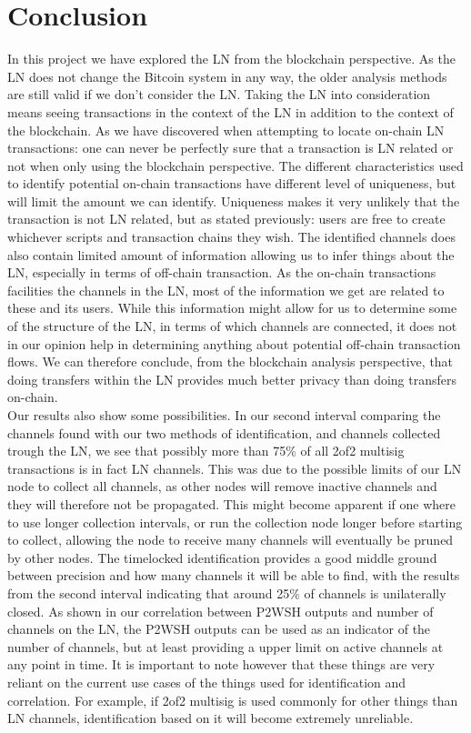 \chapter{Conclusion}
\label{chap:conclusion}

In this project we have explored the LN from the blockchain perspective.
As the LN does not change the Bitcoin system in any way, the older analysis methods are still valid if we don't consider the LN. Taking the LN into consideration means seeing transactions in the context of the LN in addition to the context of the blockchain. As we have discovered when attempting to locate on-chain LN transactions: one can never be perfectly sure that a transaction is LN related or not when only using the blockchain perspective. The different characteristics used to identify potential on-chain transactions have different level of uniqueness, but will limit the amount we can identify. Uniqueness makes it very unlikely that the transaction is not LN related, but as stated previously: users are free to create whichever scripts and transaction chains they wish. 
The identified channels does also contain limited amount of information allowing us to infer things about the LN, especially in terms of off-chain transaction. As the on-chain transactions facilities the channels in the LN, most of the information we get are related to these and its users.
While this information might allow for us to determine some of the structure of the LN, in terms of which channels are connected, it does not in our opinion help in determining anything about potential off-chain transaction flows. We can therefore conclude, from the blockchain analysis perspective, that doing transfers within the LN provides much better privacy than doing transfers on-chain.
\\


Our results also show some possibilities. In our second interval comparing the channels found with our two methods of identification, and channels collected trough the LN, we see that possibly more than 75\% of all 2of2 multisig transactions is in fact LN channels. This was due to the possible limits of our LN node to collect all channels, as other nodes will remove inactive channels and they will therefore not be propagated. This might become apparent if one where to use longer collection intervals, or run the collection node longer before starting to collect, allowing the node to receive many channels will eventually be pruned by other nodes.
The timelocked identification provides a good middle ground between precision and how many channels it will be able to find, with the results from the second interval indicating that around 25\% of channels is unilaterally closed. As shown in our correlation between P2WSH outputs and number of channels on the LN, the P2WSH outputs can be used as an indicator of the number of channels, but at least providing a upper limit on active channels at any point in time. It is important to note however that these things are very reliant on the current use cases of the things used for identification and correlation. For example, if 2of2 multisig is used commonly for other things than LN channels, identification based on it will become extremely unreliable. 
\\


